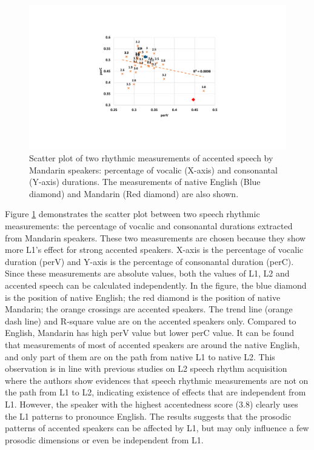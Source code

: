 \begin{figure}[t]
        \begin{minipage}[t]{1.0\linewidth}
        \centering
            \includegraphics[width=5.0in]{figures/ch7_supraseg.pdf}
        \end{minipage}%
        \caption{Scatter plot of two rhythmic measurements of accented speech by Mandarin speakers: percentage of vocalic (X-axis) and consonantal (Y-axis) durations. The measurements of native English (Blue diamond) and Mandarin (Red diamond) are also shown.}
        \centering
        \label{fig:ch7_supraseg}
     \end{figure}

Figure \ref{fig:ch7_supraseg} demonstrates the scatter plot between two speech rhythmic measurements: the percentage of vocalic and consonantal durations extracted from Mandarin speakers. These two measurements are chosen because they show more L1's effect for strong accented speakers. X-axis is the percentage of vocalic duration (perV) and Y-axis is the percentage of consonantal duration (perC). Since these measurements are absolute values, both the values of L1, L2 and accented speech can be calculated independently. In the figure, the blue diamond is the position of native English; the red diamond is the position of native Mandarin; the orange crossings are accented speakers. The trend line (orange dash line) and R-square value are on the accented speakers only. Compared to English, Mandarin has high perV value but lower perC value. It can be found that measurements of most of accented speakers are around the native English, and only part of them are on the path from native L1 to native L2. This observation is in line with previous studies on L2 speech rhythm acquisition \citep{li2014l2,lin2008interlanguage} where the authors show evidences that speech rhythmic measurements are not on the path from L1 to L2, indicating existence of effects that are independent from L1. However, the speaker with the highest accentedness score (3.8) clearly uses the L1 patterns to pronounce English. The results suggests that the prosodic patterns of accented speakers can be affected by L1, but may only influence a few prosodic dimensions or even be independent from L1.

